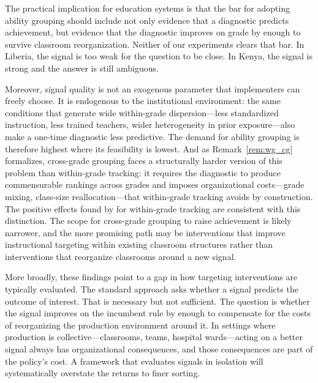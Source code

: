 \documentclass[11pt]{article}
\begin{document}
The practical implication for education systems is that the bar for adopting ability grouping should include not only evidence that a diagnostic predicts achievement, but evidence that the diagnostic improves on grade by enough to survive classroom reorganization. Neither of our experiments clears that bar. In Liberia, the signal is too weak for the question to be close. In Kenya, the signal is strong and the answer is still ambiguous.

Moreover, signal quality is not an exogenous parameter that implementers can freely choose. It is endogenous to the institutional environment: the same conditions that generate wide within-grade dispersion---less standardized instruction, less trained teachers, wider heterogeneity in prior exposure---also make a one-time diagnostic less predictive. The demand for ability grouping is therefore highest where its feasibility is lowest. And as Remark~\ref{rem:wg_cg} formalizes, cross-grade grouping faces a structurally harder version of this problem than within-grade tracking: it requires the diagnostic to produce commensurable rankings across grades and imposes organizational costs---grade mixing, class-size reallocation---that within-grade tracking avoids by construction. The positive effects found by \citet{duflo2011peer} for within-grade tracking are consistent with this distinction. The scope for cross-grade grouping to raise achievement is likely narrower, and the more promising path may be interventions that improve instructional targeting within existing classroom structures rather than interventions that reorganize classrooms around a new signal.

More broadly, these findings point to a gap in how targeting interventions are typically evaluated. The standard approach asks whether a signal predicts the outcome of interest. That is necessary but not sufficient. The question is whether the signal improves on the incumbent rule by enough to compensate for the costs of reorganizing the production environment around it. In settings where production is collective---classrooms, teams, hospital wards---acting on a better signal always has organizational consequences, and those consequences are part of the policy's cost. A framework that evaluates signals in isolation will systematically overstate the returns to finer sorting.

\clearpage
\singlespacing

\doublespacing

\end{document}

